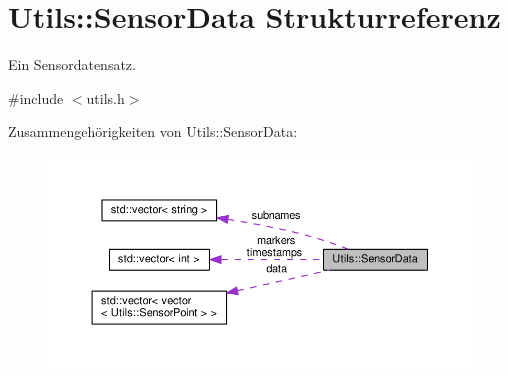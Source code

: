 \hypertarget{structUtils_1_1SensorData}{\section{Utils\-:\-:Sensor\-Data Strukturreferenz}
\label{structUtils_1_1SensorData}
}


Ein Sensordatensatz.  




{\ttfamily \#include $<$utils.\-h$>$}



Zusammengehörigkeiten von Utils\-:\-:Sensor\-Data\-:\nopagebreak
\begin{figure}[H]
\begin{center}
\leavevmode
\includegraphics[width=350pt]{structUtils_1_1SensorData__coll__graph}
\end{center}
\end{figure}
